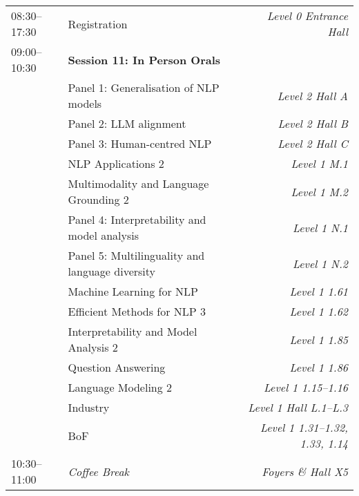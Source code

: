 \begin{xltabular}{\linewidth}{l X r}
    08:30--17:30    &   Registration    &   \textit{Level 0 Entrance Hall} \\
    
    09:00--10:30    &   \textbf{Session 11: In Person Orals} & \\
    &   Panel 1: Generalisation of NLP models   &   \textit{Level 2 Hall A} \\
    &   Panel 2: LLM alignment  &   \textit{Level 2 Hall B} \\
    &   Panel 3: Human-centred NLP  &   \textit{Level 2 Hall C} \\
    &   NLP Applications 2  &   \textit{Level 1 M.1} \\
    &   Multimodality and Language Grounding 2 &   \textit{Level 1 M.2} \\
    &   Panel 4: Interpretability and model analysis  &   \textit{Level 1 N.1} \\
    &   Panel 5: Multilinguality and language diversity  &   \textit{Level 1 N.2} \\
    &   Machine Learning for NLP  &   \textit{Level 1 1.61} \\
    &   Efficient Methods for NLP 3  &   \textit{Level 1 1.62} \\
    &   Interpretability and Model Analysis 2   &   \textit{Level 1 1.85} \\
    &   Question Answering   &   \textit{Level 1 1.86} \\
    &   Language Modeling 2   &   \textit{Level 1 1.15--1.16} \\
    &   Industry   &   \textit{Level 1 Hall L.1--L.3} \\
    &   BoF & \textit{Level 1 1.31--1.32, 1.33, 1.14}  \\

    10:30--11:00    &   \textit{Coffee Break}    & \textit{Foyers \& Hall X5}  \\


\end{xltabular}
